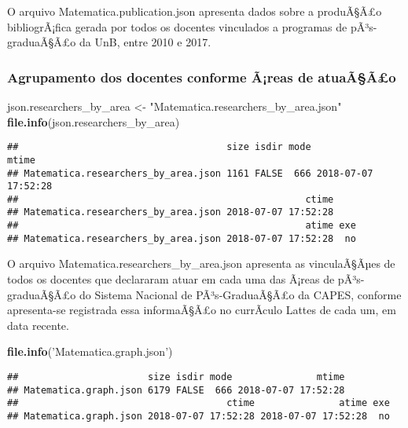 \documentclass[]{article}
\newenvironment{Shaded}{\begin{snugshade}}{\end{snugshade}}
\newcommand{\KeywordTok}[1]{\textcolor[rgb]{0.13,0.29,0.53}{\textbf{#1}}}
\newcommand{\StringTok}[1]{\textcolor[rgb]{0.31,0.60,0.02}{#1}}
\newcommand{\NormalTok}[1]{#1}
\begin{document}
O arquivo Matematica.publication.json apresenta dados sobre a produÃ§Ã£o
bibliogrÃ¡fica gerada por todos os docentes vinculados a programas de
pÃ³s-graduaÃ§Ã£o da UnB, entre 2010 e 2017.

\subsubsection{Agrupamento dos docentes conforme Ã¡reas de
atuaÃ§Ã£o}\label{agrupamento-dos-docentes-conforme-areas-de-atuaaao}

\begin{Shaded}
\begin{Highlighting}[]
\NormalTok{json.researchers_by_area <-}\StringTok{ "Matematica.researchers_by_area.json"} 
\KeywordTok{file.info}\NormalTok{(json.researchers_by_area)}
\end{Highlighting}
\end{Shaded}

\begin{verbatim}
##                                     size isdir mode               mtime
## Matematica.researchers_by_area.json 1161 FALSE  666 2018-07-07 17:52:28
##                                                   ctime
## Matematica.researchers_by_area.json 2018-07-07 17:52:28
##                                                   atime exe
## Matematica.researchers_by_area.json 2018-07-07 17:52:28  no
\end{verbatim}

O arquivo Matematica.researchers\_by\_area.json apresenta as
vinculaÃ§Ãµes de todos os docentes que declararam atuar em cada uma das
Ã¡reas de pÃ³s-graduaÃ§Ã£o do Sistema Nacional de PÃ³s-GraduaÃ§Ã£o da
CAPES, conforme apresenta-se registrada essa informaÃ§Ã£o no currÃ­culo
Lattes de cada um, em data recente.

\begin{Shaded}
\begin{Highlighting}[]
\KeywordTok{file.info}\NormalTok{(}\StringTok{'Matematica.graph.json'}\NormalTok{)}
\end{Highlighting}
\end{Shaded}

\begin{verbatim}
##                       size isdir mode               mtime
## Matematica.graph.json 6179 FALSE  666 2018-07-07 17:52:28
##                                     ctime               atime exe
## Matematica.graph.json 2018-07-07 17:52:28 2018-07-07 17:52:28  no
\end{verbatim}
\end{document}
